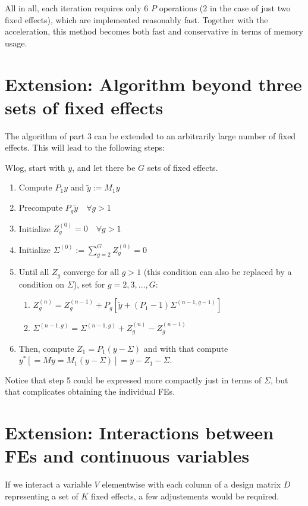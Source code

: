 \documentclass[11pt]{article}
\begin{document}
All in all, each iteration requires only 6 $P$ operations (2 in the case of just two fixed effects), which are implemented reasonably fast. Together with the acceleration, this method becomes both fast and conservative in terms of memory usage.


\section{Extension: Algorithm beyond three sets of fixed effects}

The algorithm of part 3 can be extended to an arbitrarily large number of fixed effects. This will lead to the following steps:

Wlog, start with $y$, and let there be $G$ sets of fixed effects.

\begin{enumerate}
    \item Compute $P_1y$ and $\tilde{y} := M_1y$
    \item Precompute $P_g \tilde{y} \quad \forall g>1$
    \item Initialize $Z_g^{(0)} = 0 \quad \forall g>1$
    \item Initialize $\Sigma^{(0)} := \sum_{g=2}^G Z_g^{(0)} = 0$
    \item Until all $Z_g$ converge for all $g>1$ (this condition can also be replaced by a condition on $\Sigma$), set for $g=2, 3, \ldots, G$:
        \begin{enumerate}
        \item $Z_g^{(n)} = Z_g^{(n-1)} + P_g \left[ \tilde{y} + (P_1 - 1) \Sigma^{(n-1,g-1)} \right]$
        \item $\Sigma^{(n-1,g)} = \Sigma^{(n-1,g)} + Z_g^{(n)} - Z_g^{(n-1)}$
        \end{enumerate}
    \item Then, compute $Z_1 = P_1(y - \Sigma)$ and with that compute $y^* [ = M y = M_1 (y- \Sigma)  ] = y - Z_1 - \Sigma$.
\end{enumerate}

Notice that step 5 could be expressed more compactly just in terms of $\Sigma$, but that complicates obtaining the individual FEs.

\section{Extension: Interactions between FEs and continuous variables}

 If we interact a variable $V$ elementwise with each column of a design matrix $D$ representing a set of $K$ fixed effects, a few adjustements would be required.
\end{document}
